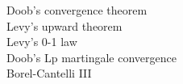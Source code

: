 \documentclass[paper=a4, fontsize=11pt]{scrartcl} %
\numberwithin{equation}{section} %
\numberwithin{figure}{section} %
\numberwithin{table}{section} %
\begin{document}
Doob's convergence theorem\\
Levy's upward theorem\\
Levy's 0-1 law\\
Doob's Lp martingale convergence\\
Borel-Cantelli III
\end{document}
